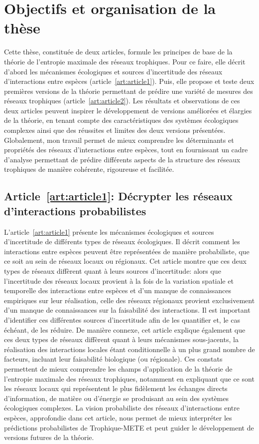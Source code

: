 
\section{Objectifs et organisation de la thèse} 

Cette thèse, constituée de deux articles, formule les principes de base de la
théorie de l'entropie maximale des réseaux trophiques. Pour ce faire, elle
décrit d'abord les mécanismes écologiques et sources d'incertitude des réseaux
d'interactions entre espèces (article~\ref{art:article1}). Puis, elle propose et
teste deux premières versions de la théorie permettant de prédire une variété de
mesures des réseaux trophiques (article~\ref{art:article2}). Les résultats et
observations de ces deux articles peuvent inspirer le développement de versions
améliorées et élargies de la théorie, en tenant compte des caractéristiques des
systèmes écologiques complexes ainsi que des réussites et limites des deux
versions présentées. Globalement, mon travail permet de mieux comprendre les
déterminants et propriétés des réseaux d'interactions entre espèces, tout en
fournissant un cadre d'analyse permettant de prédire différents aspects de la
structure des réseaux trophiques de manière cohérente, rigoureuse et facilitée.

\subsection{Article~\ref{art:article1}: Décrypter les réseaux d'interactions probabilistes} 

L'article~\ref{art:article1} présente les mécanismes écologiques et sources
d'incertitude de différents types de réseaux écologiques. Il décrit comment les
interactions entre espèces peuvent être représentées de manière probabiliste,
que ce soit au sein de réseaux locaux ou régionaux. Cet article montre que ces
deux types de réseaux diffèrent quant à leurs sources d'incertitude: alors que
l'incertitude des réseaux locaux provient à la fois de la variation spatiale et
temporelle des interactions entre espèces et d'un manque de connaissances
empiriques sur leur réalisation, celle des réseaux régionaux provient
exclusivement d'un manque de connaissances sur la faisabilité des interactions.
Il est important d'identifier ces différentes sources d'incertitude afin de les
quantifier et, le cas échéant, de les réduire. De manière connexe, cet article
explique également que ces deux types de réseaux diffèrent quant à leurs
mécanismes sous-jacents, la réalisation des interactions locales étant
conditionnelle à un plus grand nombre de facteurs, incluant leur faisabilité
biologique (ou régionale). Ces constats permettent de mieux comprendre les
champs d'application de la théorie de l'entropie maximale des réseaux
trophiques, notamment en expliquant que ce sont les réseaux locaux qui
représentent le plus fidèlement les échanges directs d'information, de matière
ou d'énergie se produisant au sein des systèmes écologiques complexes. La vision
probabiliste des réseaux d'interactions entre espèces, approfondie dans cet
article, nous permet de mieux interpréter les prédictions probabilistes de
Trophique-METE et peut guider le développement de versions futures de la
théorie.

